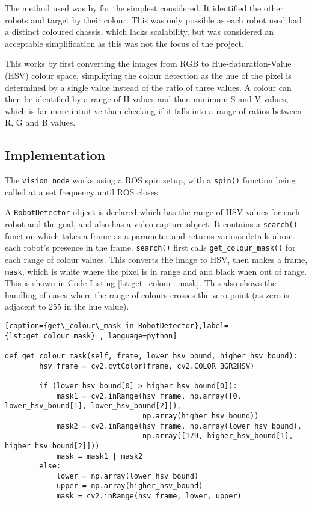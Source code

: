 The method used was by far the simplest considered. It identified the other robots and target
by their colour. This was only possible as each robot used had a distinct coloured chassis,
which lacks scalability, but was considered an acceptable simplification as this was not the
focus of the project.

This works by first converting the images from RGB to Hue-Saturation-Value (HSV) colour space,
simplifying the colour detection as the hue of the pixel is determined by a single value
instead of the ratio of three values. A colour can then be identified by a range of H values
and then minimum S and V values, which is far more intuitive than checking if it falls into a
range of ratios between R, G and B values.

\subsection{Implementation}\label{soft/cv/impl}
The \verb|vision_node| works using a ROS spin setup, with a \verb|spin()| function being
called at a set frequency until ROS closes.

A \verb|RobotDetector| object is declared which has the range of HSV values for each robot
and the goal, and also has a video capture object. It contains a \verb|search()| function which
takes a frame as a parameter and returns various details about each robot's presence in the
frame. \verb|search()| first calls \verb|get_colour_mask()| for each range of colour
values. This converts the image to HSV, then makes a frame, \verb|mask|, which is white where
the pixel is in range and and black when out of range. This is shown in Code Listing
\ref{lst:get_colour_mask}. This also shows the handling of cases where the range of colours
crosses the zero point (as zero is adjacent to 255 in the hue value).

\begin{lstlisting}[caption={get\_colour\_mask in RobotDetector},label={lst:get_colour_mask} , language=python]

def get_colour_mask(self, frame, lower_hsv_bound, higher_hsv_bound):
        hsv_frame = cv2.cvtColor(frame, cv2.COLOR_BGR2HSV)

        if (lower_hsv_bound[0] > higher_hsv_bound[0]):
            mask1 = cv2.inRange(hsv_frame, np.array([0, lower_hsv_bound[1], lower_hsv_bound[2]]),
                                np.array(higher_hsv_bound))
            mask2 = cv2.inRange(hsv_frame, np.array(lower_hsv_bound),
                                np.array([179, higher_hsv_bound[1], higher_hsv_bound[2]]))
            mask = mask1 | mask2
        else:
            lower = np.array(lower_hsv_bound)
            upper = np.array(higher_hsv_bound)
            mask = cv2.inRange(hsv_frame, lower, upper)

\end{lstlisting}

